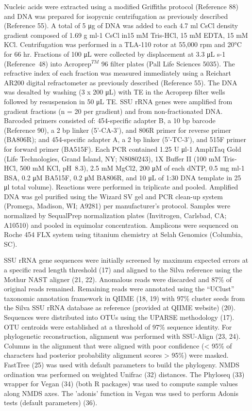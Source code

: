 Nucleic acids were extracted using a modified Griffiths protocol (Reference 88)
and DNA was prepared for isopycnic centrifugation as previously described
(Reference 55). A total of 5 μg of DNA was added to each 4.7 ml CsCl density
gradient composed of 1.69 g ml-1 CsCl in15 mM Tris-HCl, 15 mM EDTA, 15 mM KCl.
Centrifugation was performed in a TLA-110 rotor at 55,000 rpm and 20°C for 66
hr. Fractions of 100 μL were collected by displacement at 3.3 μL s-1
(Reference~48) into Acroprep$^{TM}$ 96 filter plates (Pall Life Sciences 5035).
The refractive index of each fraction was measured immediately using a Reichart
AR200 digital refractometer as previously described (Reference 55). The DNA was
desalted by washing (3 x 200 μL) with TE in the Acroprep filter wells followed
by resuspension in 50 μL TE. SSU rRNA genes were amplified from gradient
fractions (n = 20 per gradient) and from non-fractionated DNA.
Barcoded primers consisted of: 454-specific adapter B, a 10 bp barcode
(Reference 90), a 2 bp linker (5’-CA-3’), and 806R primer for reverse primer
(BA806R); and 454-specific adapter A, a 2 bp linker (5’-TC-3’), and 515F primer
for forward primer (BA515F). Each PCR contained 1.25 U μl-1 AmpliTaq Gold (Life
Technologies, Grand Island, NY; N8080243), 1X Buffer II (100 mM Tris-HCl, 500
mM KCl, pH~8.3), 2.5 mM MgCl2, 200 μM of each dNTP, 0.5 mg ml-1 BSA, 0.2 μM
BA515F, 0.2 μM BA806R, and 10 μL of 1:30 DNA template in 25 μl total volume).
Reactions were performed in triplicate and pooled. Amplified DNA was gel
purified using the Wizard SV gel and PCR clean-up system (Promega, Madison, WI;
A9281) per manufacturer’s protocol. Samples were normalized by SequalPrep
normalization plates (Invitrogen, Carlsbad, CA; A10510) and pooled in equimolar
concentration. Amplicons were sequenced on Roche 454 FLX system using titanium
chemistry at Selah Genomics (Columbia, SC). 

SSU rRNA gene sequences were initially screened by maximum expected
errors at a specific read length threshold (17) and aligned to the Silva
reference using the Mothur NAST aligner (21, 22). Anomalous reads were
discarded and 87\% of original reads remained. Remaining reads were annotated
using the “UClust” taxonomic annotation framework in QIIME (18, 19) with 97\%
cluster seeds from the Silva SSU rRNA database as reference (provided at QIIME
website) (20). Sequences were distributed into OTUs using the UPARSE
methodology (17). OTU centroids were established at a threshold of 97\%
sequence identity. For phylogenetic reconstruction, alignment was performed
with SSU-Align (23, 24). Columns in the alignment that were aligned with poor
confidence (< 95\% of characters had posterior probability alignment scores
> 95\%) were masked. FastTree (25) was used with default parameters to build
the phylogeny. NMDS ordination was performed on weighted Unifrac (32)
distances. The Phyloseq (33) wrapper for Vegan (34) (both R packages) was used
to compute sample values along NMDS axes. The 'adonis' function in Vegan was
used to perform Adonis tests (default parameters) (36). 

